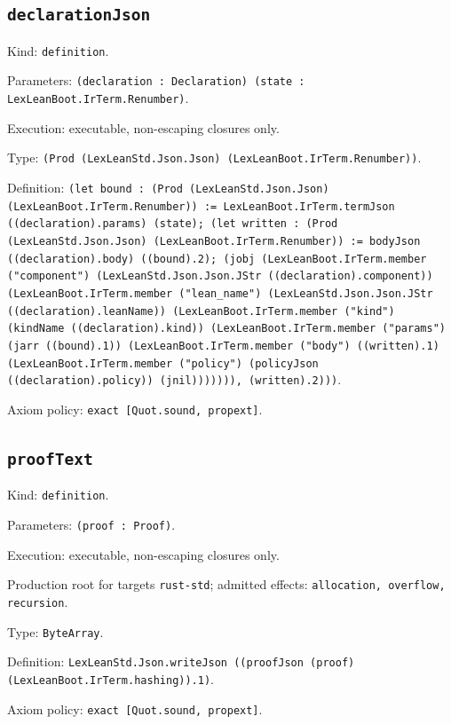 \documentclass[11pt]{article}
\begin{document}
\subsection*{\texttt{declarationJson}}
\noindent Kind: \texttt{definition}.\par
\noindent Parameters: \texttt{(declaration : Declaration) (state : LexLeanBoot.IrTerm.Renumber)}.\par
\noindent Execution: executable, non-escaping closures only.\par
\noindent Type: \texttt{(Prod (LexLeanStd.Json.Json) (LexLeanBoot.IrTerm.Renumber))}.\par
\noindent Definition: \texttt{(let bound : (Prod (LexLeanStd.Json.Json) (LexLeanBoot.IrTerm.Renumber)) := LexLeanBoot.IrTerm.termJson ((declaration).params) (state); (let written : (Prod (LexLeanStd.Json.Json) (LexLeanBoot.IrTerm.Renumber)) := bodyJson ((declaration).body) ((bound).2); (jobj (LexLeanBoot.IrTerm.member ("component") (LexLeanStd.Json.Json.JStr ((declaration).component)) (LexLeanBoot.IrTerm.member ("lean\_name") (LexLeanStd.Json.Json.JStr ((declaration).leanName)) (LexLeanBoot.IrTerm.member ("kind") (kindName ((declaration).kind)) (LexLeanBoot.IrTerm.member ("params") (jarr ((bound).1)) (LexLeanBoot.IrTerm.member ("body") ((written).1) (LexLeanBoot.IrTerm.member ("policy") (policyJson ((declaration).policy)) (jnil))))))), (written).2)))}.\par
\noindent Axiom policy: \texttt{exact [Quot.sound, propext]}.\par
\subsection*{\texttt{proofText}}
\noindent Kind: \texttt{definition}.\par
\noindent Parameters: \texttt{(proof : Proof)}.\par
\noindent Execution: executable, non-escaping closures only.\par
\noindent Production root for targets \texttt{rust-std}; admitted effects: \texttt{allocation, overflow, recursion}.\par
\noindent Type: \texttt{ByteArray}.\par
\noindent Definition: \texttt{LexLeanStd.Json.writeJson ((proofJson (proof) (LexLeanBoot.IrTerm.hashing)).1)}.\par
\noindent Axiom policy: \texttt{exact [Quot.sound, propext]}.\par
\end{document}
